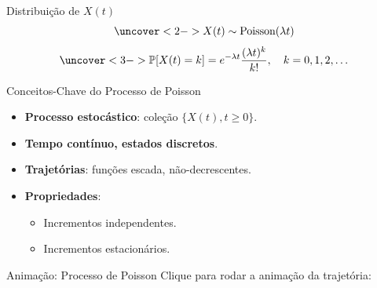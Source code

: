 \documentclass{beamer}
\begin{document}
\begin{frame}{Distribuição de $X(t)$}
\[
\uncover<2->{X(t) \sim \text{Poisson}(\lambda t)}
\]
\[
\uncover<3->{\mathbb{P}[X(t) = k] = e^{-\lambda t} \frac{(\lambda t)^k}{k!}, 
\quad k = 0,1,2,\dots}
\]

\pause
\begin{center}
\end{center}
\end{frame}

\begin{frame}{Conceitos-Chave do Processo de Poisson}
\begin{itemize}
  \item<1-> \textbf{Processo estocástico}: coleção $\{X(t), t \geq 0\}$.
  \item<2-> \textbf{Tempo contínuo, estados discretos}.
  \item<3-> \textbf{Trajetórias}: funções escada, não-decrescentes.
  \item<4-> \textbf{Propriedades}:
    \begin{itemize}
      \item<5-> Incrementos independentes.
      \item<6-> Incrementos estacionários.
    \end{itemize}
\end{itemize}
\end{frame}

\begin{frame}{Animação: Processo de Poisson}
Clique para rodar a animação da trajetória:

\end{frame}
\end{document}
